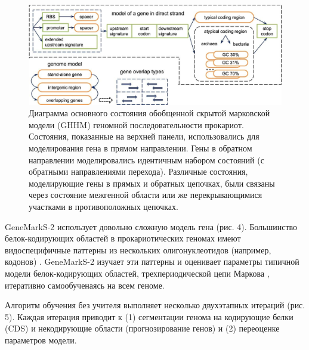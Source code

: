 \documentclass[14pt]{extarticle}
\begin{document}
    \begin{figure}[]
            \centering
            \includegraphics[width=\textwidth]{img/gms2_1.jpg}
            \caption{Диаграмма основного состояния обобщенной скрытой марковской модели (GHHM) геномной 
            последовательности прокариот. Состояния, показанные на верхней панели, использовались для моделирования гена
            в прямом направлении. Гены в обратном направлении моделировались идентичным набором состояний (с обратными 
            направлениями перехода). Различные состояния, моделирующие гены в прямых и обратных цепочках, были связаны 
            через состояние межгенной области или же перекрывающимися участками в противоположных цепочках. 
            \cite{lomsad}}
            \label{fig:skybox}
    \end{figure}
    
    \par{GeneMarkS-2 использует довольно сложную модель гена (рис. 4). Большинство белок-кодирующих областей в 
    прокариотических геномах имеют видоспецифичные паттерны из нескольких олигонуклеотидов (например, кодонов) \cite{fickett}. GeneMarkS-2 изучает эти паттерны и оценивает параметры типичной модели белок-кодирующих областей, 
    трехпериодической цепи Маркова \cite{bordov2}, итеративно самообученаясь на всем геноме.}
    
    
    \par{Алгоритм обучения без учителя выполняет несколько двухэтапных итераций (рис. 5). Каждая итерация приводит к (1)
    сегментации генома на кодирующие белки (CDS) и некодирующие области (прогнозирование генов) и (2) переоценке 
    параметров модели.}
    
\end{document}
